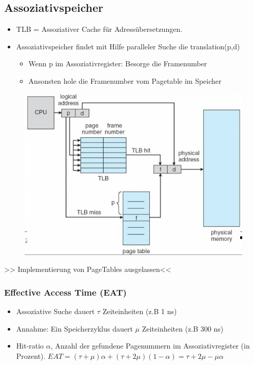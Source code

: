 \documentclass[a4paper]{scrreprt}
\begin{document}
\subsection{Assoziativspeicher}
\begin{itemize}
\item TLB = Assoziativer Cache für Adressübersetzungen.
\item Assoziativspeicher findet mit Hilfe paralleler Suche die translation(p,d)
\begin{itemize}
\item Wenn p im Assoziativregister: Besorge die Framenumber
\item Ansonsten hole die Framenumber vom Pagetable im Speicher
\end{itemize}
\end{itemize}
\begin{figure}[ht]
\centering
\includegraphics[scale=0.40]{tlb.png}
\end{figure}


>> Implementierung von PageTables ausgelassen<<
\subsubsection{Effective Access Time (EAT)}
\begin{itemize}
\item Assoziative Suche dauert $\tau$ Zeiteinheiten (z.B 1 ns)
\item Annahme: Ein Speicherzyklus dauert $\mu$ Zeiteinheiten (z.B 300 ns)
\item Hit-ratio $\alpha$, Anzahl der gefundene Pagenummern im Assoziativregister (in Prozent). 
$EAT = (\tau + \mu)  \alpha + (\tau + 2\mu) (1-\alpha) = \tau +2\mu - \mu\alpha$
\end{itemize}
\end{document}
